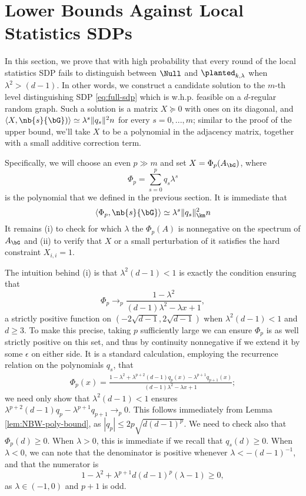 \section{Lower Bounds Against Local Statistics SDPs}
\label{sec:lower bound}

In this section, we prove that with high probability that every round of the local statistics SDP fails to distinguish between $\Null$ and $\planted_{k,\lambda}$ when $\lambda^2 > (d-1)$. In other words, we construct a candidate solution to the $m$-th level distinguishing SDP \eqref{eq:full-sdp} which is w.h.p. feasible on a $d$-regular random graph. Such a solution is a matrix $X \succeq 0$ with ones on its diagonal, and $\langle X, \nb{s}{\bG}) \rangle \simeq \lambda^s \|q_s\|^2 n$ for every $s = 0,...,m$; similar to the proof of the upper bound, we'll take $X$ to be a polynomial in the adjacency matrix, together with a small additive correction term.

Specifically, we will choose an even $p\gg m$ and set $X = \Phi_p(A_{\bG})$, where
$$
    \Phi_p = \sum_{s = 0}^p q_s \lambda^s
$$
is the polynomial that we defined in the previous section. It is immediate that
$$
    \langle \Phi_p,\nb{s}{\bG} \rangle \simeq \lambda^s\|q_s\|_{\km}^2 n 
$$
It remains (i) to check for which $\lambda$ the $\Phi_p(A)$ is nonnegative on the spectrum of $A_{\bG}$ and (ii) to verify that $X$ or a small perturbation of it satisfies the hard constraint $X_{i,i} = 1$.

The intuition behind (i) is that $\lambda^2(d-1)<1$ is exactly the condition ensuring that
$$
    \Phi_p \to_p \frac{1 - \lambda^2}{(d-1)\lambda^2 - \lambda x + 1},
$$
a strictly positive function on $(-2\sqrt{d-1},2\sqrt{d-1})$ when $\lambda^2(d-1) < 1$ and $d \ge 3$. To make this precise, taking $p$ sufficiently large we can ensure $\Phi_p$ is as well strictly positive on this set, and thus by continuity nonnegative if we extend it by some $\epsilon$ on either side. It is a standard calculation, employing the recurrence relation on the polynomials $q_s$, that
\begin{align*}
    \Phi_p(x) = \frac{1 - \lambda^2 + \lambda^{p+2}(d-1)q_p(x) - \lambda^{p+1}q_{p+1}(x)}{(d-1)\lambda^2 - \lambda x + 1};
\end{align*}
we need only show that $\lambda^2(d-1)<1$ ensures $\lambda^{p+2}(d-1)q_p - \lambda^{p+1}q_{p+1} \to_p 0$. This follows immediately from Lemma \ref{lem:NBW-poly-bound}, as $|q_p| \le 2p\sqrt{d(d-1)^p}$. We need to check also that $\Phi_p(d) \ge 0$. When $\lambda > 0$, this is immediate if we recall that $q_s(d) \ge 0$. When $\lambda < 0$, we can note that the denominator is positive whenever $\lambda < -(d-1)^{-1}$, and that the numerator is
$$
    1 - \lambda^2 + \lambda^{p+1}d(d-1)^{p}(\lambda - 1) \ge 0,
$$
as $\lambda \in (-1,0)$ and $p+1$ is odd.

